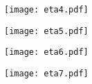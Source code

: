 \documentclass[12pt]{article}
\begin{document}
\begin{figure}[htbp]
\centering
\texttt{[image: eta4.pdf]}
\end{figure}
\clearpage

\begin{figure}[htbp]
\centering
\texttt{[image: eta5.pdf]}
\end{figure}
\clearpage

\begin{figure}[htbp]
\centering
\texttt{[image: eta6.pdf]}
\end{figure}
\clearpage

\begin{figure}[htbp]
\centering
\texttt{[image: eta7.pdf]}
\end{figure}
\clearpage
\end{document}
